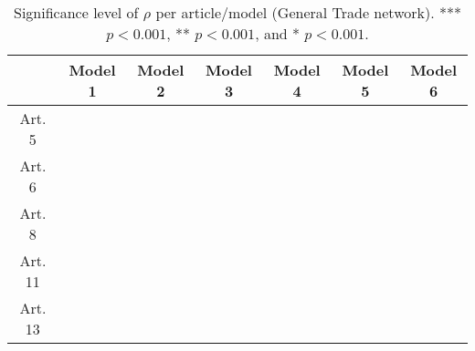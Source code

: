 \begin{table}[ht]
\centering
\begin{tabular}{ccccccc}
  \toprule
 & Model 1 & Model 2 & Model 3 & Model 4 & Model 5 & Model 6 \\ 
  \midrule
Art. 5 &   &   &   &   &   &   \\ 
   \midrule
Art. 6 &   &   &   &   &   &   \\ 
   \midrule
Art. 8 &   &   &   &   &   &   \\ 
   \midrule
Art. 11 &   &   &   &   &   &   \\ 
   \midrule
Art. 13 &   &   &   &   &   &   \\ 
   \bottomrule
\end{tabular}
\caption{Significance level of $\rho$ per article/model (General Trade network). *** $p < 0.001$, ** $p < 0.001$, and * $p < 0.001$.} 
\end{table}
